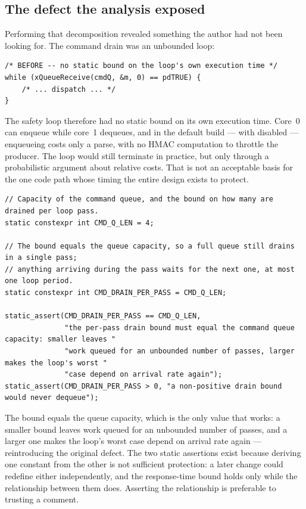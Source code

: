 \subsection{The defect the analysis exposed}\label{sec:impl-drain}

Performing that decomposition revealed something the author had not been looking for. The
command drain was an unbounded loop:

\begin{lstlisting}[style=cpp,caption={The defective drain, before the repair}]
/* BEFORE -- no static bound on the loop's own execution time */
while (xQueueReceive(cmdQ, &m, 0) == pdTRUE) {
    /* ... dispatch ... */
}
\end{lstlisting}

The safety loop therefore had no static bound on its own execution time. Core~0 can enqueue
while core~1 dequeues, and in the default build — with  disabled —
enqueueing costs only a parse, with no HMAC computation to throttle the producer. The loop
would still terminate in practice, but only through a probabilistic argument about relative
costs. That is not an acceptable basis for the one code path whose timing the entire design
exists to protect.

\begin{lstlisting}[style=cpp,caption={The repaired bound and its assertions,
\code{smart\_home.ino}},label={lst:drain}]
// Capacity of the command queue, and the bound on how many are drained per loop pass.
static constexpr int CMD_Q_LEN = 4;

// The bound equals the queue capacity, so a full queue still drains in a single pass;
// anything arriving during the pass waits for the next one, at most one loop period.
static constexpr int CMD_DRAIN_PER_PASS = CMD_Q_LEN;

static_assert(CMD_DRAIN_PER_PASS == CMD_Q_LEN,
              "the per-pass drain bound must equal the command queue capacity: smaller leaves "
              "work queued for an unbounded number of passes, larger makes the loop's worst "
              "case depend on arrival rate again");
static_assert(CMD_DRAIN_PER_PASS > 0, "a non-positive drain bound would never dequeue");
\end{lstlisting}

The bound equals the queue capacity, which is the only value that works: a smaller bound leaves
work queued for an unbounded number of passes, and a larger one makes the loop's worst case
depend on arrival rate again — reintroducing the original defect. The two static assertions
exist because deriving one constant from the other is not sufficient protection: a later change
could redefine either independently, and the response-time bound holds only while the
relationship between them does. Asserting the relationship is preferable to trusting a comment.

